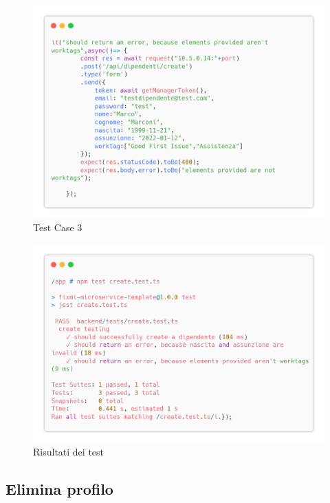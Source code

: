 \documentclass{report}
\begin{document}
\begin{figure}[H]
	\centering\includegraphics[width=1\textwidth]{images/microservizio-dipendenti/tests/create_test_3.png}
	\caption{Test Case 3}
\end{figure}
\begin{figure}[H]
	\centering\includegraphics[width=1\textwidth]{images/microservizio-dipendenti/tests/create_test_results.png}
	\caption{Risultati dei test}
\end{figure}
\subsection{Elimina profilo}
\end{document}
